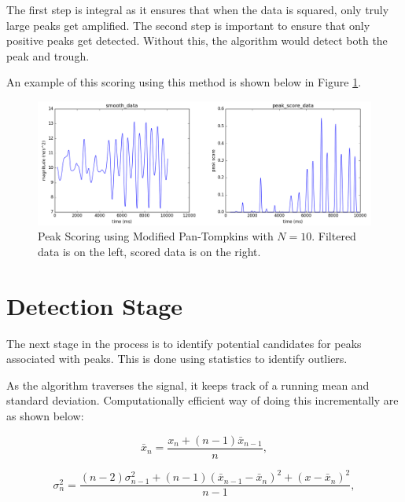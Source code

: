                 The first step is integral as it ensures that when the data is squared, only truly large peaks get amplified. The second step is important to ensure that only positive peaks get detected. Without this, the algorithm would detect both the peak and trough.

                An example of this scoring using this method is shown below in Figure \ref{pan_tompkins_score}.

                \begin{figure}[!th]
                    \includegraphics[width=\textwidth]{Images/pan_tompkins_score.png}
                    \centering
                    \caption{Peak Scoring using Modified Pan-Tompkins with $N=10$. Filtered data is on the left, scored data is on the right.}
                    \label{pan_tompkins_score}
                \end{figure}


        \section{Detection Stage}

            The next stage in the process is to identify potential candidates for peaks associated with peaks. This is done using statistics to identify outliers. 

            As the algorithm traverses the signal, it keeps track of a running mean and standard deviation. Computationally efficient way of doing this incrementally are as shown below:

            \begin{equation}
                \bar{x}_n = \frac{x_n + (n-1)\bar{x}_{n-1}}{n},
            \end{equation}

            \begin{equation}
                \sigma_n^2 = \frac
                {(n-2)\sigma_{n-1}^2 + (n-1)(\bar{x}_{n-1} -\bar{x}_n)^2 + (x - \bar{x}_n)^2}
                {n-1},
            \end{equation}

